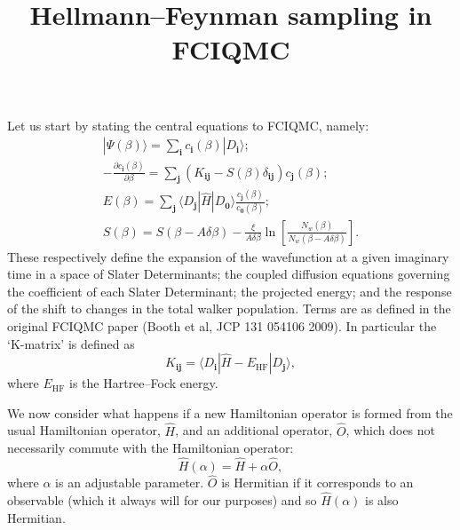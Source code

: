 \documentclass[a4paper, 11pt]{article}
\newcommand{\bi}{\mathbf{i}}
\newcommand{\bj}{\mathbf{j}}
\newcommand{\bz}{\mathbf{0}}
\newcommand{\dd}[2]{\frac{\partial#1}{\partial#2}}
\newcommand{\bra}{\langle}
\newcommand{\ket}{\rangle}
\newcommand{\EHF}{E_{\text{HF}}}
\begin{document}
\title{Hellmann--Feynman sampling in FCIQMC}

\maketitle

Let us start by stating the central equations to FCIQMC, namely:
\begin{gather}
|\Psi(\beta)\ket = \sum_\bi c_\bi(\beta) | D_\bi \ket; \\
- \dd{c_\bi(\beta)}{\beta} = \sum_\bj (K_{\bi\bj} - S(\beta) \delta_{\bi\bj}) c_\bj(\beta); \\
E(\beta) = \sum_\bj \bra D_\bj | \hat{H} | D_\bz \ket \frac{c_\bj(\beta)}{c_\bz(\beta)}; \\
S(\beta) = S(\beta - A\delta\beta) - \frac{\xi}{A\delta\beta} \ln{\left[\frac{N_w(\beta)}{N_w(\beta-A\delta\beta)}\right]}.
\end{gather}
These respectively define the expansion of the wavefunction at a given imaginary time in a space of Slater Determinants; the coupled diffusion equations governing the coefficient of each Slater Determinant; the projected energy; and the response of the shift to changes in the total walker population.  Terms are as defined in the original FCIQMC paper (Booth et al, JCP 131 054106 2009).  In particular the `K-matrix' is defined as 
\begin{equation}
K_{\bi\bj} = \bra D_\bi | \hat{H} - \EHF | D_\bj \ket,
\end{equation}
where $\EHF$ is the Hartree--Fock energy.

We now consider what happens if a new Hamiltonian operator is formed from the usual Hamiltonian operator, $\hat{H}$, and an additional operator, $\hat{O}$, which does not necessarily commute with the Hamiltonian operator:
\begin{equation}
\hat{H}(\alpha) = \hat{H} + \alpha \hat{O},
\end{equation}
where $\alpha$ is an adjustable parameter.  $\hat{O}$ is Hermitian if it corresponds to an observable (which it always will for our purposes) and so
$\hat{H}(\alpha)$ is also Hermitian.
\end{document}
